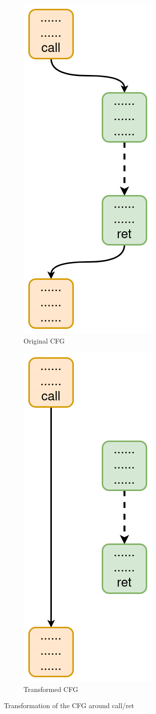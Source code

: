 \documentclass[english]{article}
\begin{document}
\begin{figure}[htp]
	\centering
	\begin{subfigure}{.5\textwidth}
		\centering 	
		\includegraphics[width=.4\linewidth]{img/CallRetBefore.png}
		\caption{Original CFG}
	\end{subfigure}%
	\begin{subfigure}{.5\textwidth}
		\centering 	
		\includegraphics[width=.4\linewidth]{img/CallRetAfter.png}
		\caption{Transformed CFG}
	\end{subfigure}
	
	\caption{Transformation of the CFG around call/ret}
	\label{fig:callRet}
\end{figure}
 
\end{document}

